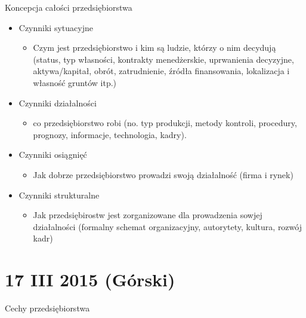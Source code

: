 \documentclass[a4paper,10pt]{report}
\begin{document}
\noindent Koncepcja całości przedsiębiorstwa
\begin{itemize}
	\item Czynniki sytuacyjne
	\begin{itemize}
		\item Czym jest przedsiębiorstwo i kim są ludzie, którzy o nim decydują (status, typ własności, kontrakty menedżerskie, uprwanienia decyzyjne, aktywa/kapitał, obrót, zatrudnienie, źródła finansowania, lokalizacja i własność gruntów itp.)
	\end{itemize}
	\item Czynniki działalności
	\begin{itemize}
		\item co przedsiębiorstwo robi (no. typ produkcji, metody kontroli, procedury, prognozy, informacje, technologia, kadry).
	\end{itemize}
	\item Czynniki osiągnięć
	\begin{itemize}
		\item Jak dobrze przedsiębiorstwo prowadzi swoją działalność (firma i rynek)
	\end{itemize}
	\item Czynniki strukturalne
	\begin{itemize}
		\item Jak przedsiębirostw jest zorganizowane dla prowadzenia sowjej działalności (formalny schemat organizacyjny, autorytety, kultura, rozwój kadr)
	\end{itemize}
\end{itemize}

\section{17 III 2015 (Górski)}

\noindent Cechy przedsiębiorstwa 
\end{document}
